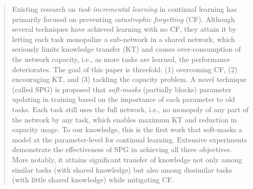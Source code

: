 \begin{abstract}
Existing research on \textit{task incremental learning} in continual learning has primarily focused on preventing \textit{catastrophic forgetting} (CF).
Although several techniques have achieved learning with no CF, they attain it by letting each task monopolize a sub-network in a shared network, which seriously limits knowledge transfer (KT) and causes over-consumption of the network capacity, i.e., as more tasks are learned, the performance deteriorates. 
The goal of this paper is threefold: (1) overcoming CF, (2) encouraging KT, and (3) tackling the capacity problem. 
A novel technique (called SPG) is proposed that \textit{soft-masks} (partially blocks) parameter updating in training based on the importance of each parameter to old tasks. 
Each task still uses the full network, i.e., no monopoly of any part of the network by any task, which enables maximum KT and reduction in capacity usage.
To our knowledge, this is the first work that soft-masks a model at the parameter-level for continual learning.
Extensive experiments demonstrate the effectiveness of SPG in achieving all three objectives. 
More notably, it attains significant transfer of knowledge not only among similar tasks (with shared knowledge) but also among dissimilar tasks (with little shared knowledge) while mitigating CF.
\end{abstract}